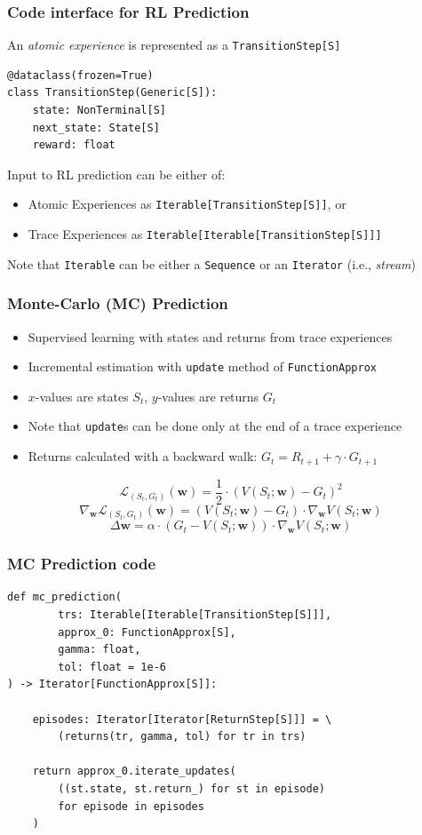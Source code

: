 \documentclass[handout]{beamer}
\begin{document}
\begin{frame}[fragile]
\frametitle{Code interface for RL Prediction}
\pause
An {\em atomic experience} is represented as a \lstinline{TransitionStep[S]}
\pause
\begin{lstlisting}
@dataclass(frozen=True)
class TransitionStep(Generic[S]):
    state: NonTerminal[S]
    next_state: State[S]
    reward: float
\end{lstlisting}
\pause
\vspace{3mm}
Input to RL prediction can be either of:
\pause
\begin{itemize}[<+->]
\item Atomic Experiences as \lstinline{Iterable[TransitionStep[S]]}, or
\item Trace Experiences as \lstinline{Iterable[Iterable[TransitionStep[S]]]}
\end{itemize}
\pause
\vspace{3mm}
Note that \lstinline{Iterable} can be either a \lstinline{Sequence} or an \lstinline{Iterator} (i.e., {\em stream})
\end{frame}


\begin{frame}
\frametitle{Monte-Carlo (MC) Prediction}
\pause
\begin{itemize}[<+->]
\item Supervised learning with states and returns from trace experiences
\item Incremental estimation with \lstinline{update} method of \lstinline{FunctionApprox}
\item $x$-values are states $S_t$, $y$-values are returns $G_t$
\item Note that \lstinline{update}s can be done only at the end of a trace experience
\item Returns calculated with a backward walk: $G_t = R_{t+1} + \gamma \cdot G_{t+1}$
\end{itemize}
\pause
$$\mathcal{L}_{(S_t,G_t)}(\bm{w}) = \frac 1 2 \cdot (V(S_t;\bm{w}) - G_t)^2$$
\pause
$$\nabla_{\bm{w}} \mathcal{L}_{(S_t,G_t)}(\bm{w}) = (V(S_t;\bm{w}) - G_t) \cdot \nabla_{\bm{w}} V(S_t;\bm{w})$$
\pause
$$\Delta \bm{w} = \alpha \cdot (G_t - V(S_t;\bm{w})) \cdot \nabla_{\bm{w}} V(S_t;\bm{w})$$
\end{frame}

\begin{frame}[fragile]
\frametitle{MC Prediction code}
\pause
\begin{lstlisting}
def mc_prediction(
        trs: Iterable[Iterable[TransitionStep[S]]],
        approx_0: FunctionApprox[S],
        gamma: float,
        tol: float = 1e-6
) -> Iterator[FunctionApprox[S]]:

    episodes: Iterator[Iterator[ReturnStep[S]]] = \
        (returns(tr, gamma, tol) for tr in trs)

    return approx_0.iterate_updates(
        ((st.state, st.return_) for st in episode)
        for episode in episodes
    )
\end{lstlisting}    
\end{frame}
\end{document}
